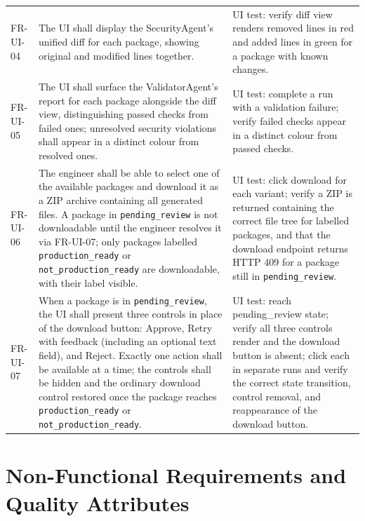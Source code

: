 \begin{longtable}{@{}p{}p{}p{}@{}}
FR-UI-04 & The UI shall display the SecurityAgent's unified diff for each
  package, showing original and modified lines together. &
  UI test: verify diff view renders removed lines in red and added lines
  in green for a package with known changes. \\

FR-UI-05 & The UI shall surface the ValidatorAgent's report for each
  package alongside the diff view, distinguishing passed checks from
  failed ones; unresolved security violations shall appear in a distinct
  colour from resolved ones. &
  UI test: complete a run with a validation failure; verify failed checks
  appear in a distinct colour from passed checks. \\

FR-UI-06 & The engineer shall be able to select one of the available
  packages and download it as a ZIP archive containing all generated
  files. A package in \texttt{pending\_review} is not downloadable until
  the engineer resolves it via FR-UI-07; only packages labelled
  \texttt{production\_ready} or \texttt{not\_production\_ready} are
  downloadable, with their label visible. &
  UI test: click download for each variant; verify a ZIP is returned
  containing the correct file tree for labelled packages, and that the
  download endpoint returns HTTP 409 for a package still in
  \texttt{pending\_review}. \\

FR-UI-07 & When a package is in \texttt{pending\_review}, the UI shall
  present three controls in place of the download button: Approve, Retry
  with feedback (including an optional text field), and Reject. Exactly
  one action shall be available at a time; the controls shall be hidden
  and the ordinary download control restored once the package reaches
  \texttt{production\_ready} or \texttt{not\_production\_ready}. &
  UI test: reach pending\_review state; verify all three controls render
  and the download button is absent; click each in separate runs and
  verify the correct state transition, control removal, and reappearance
  of the download button. \\

\bottomrule
\end{longtable}

\section{Non-Functional Requirements and Quality Attributes}
\label{sec:nonfunctional}

